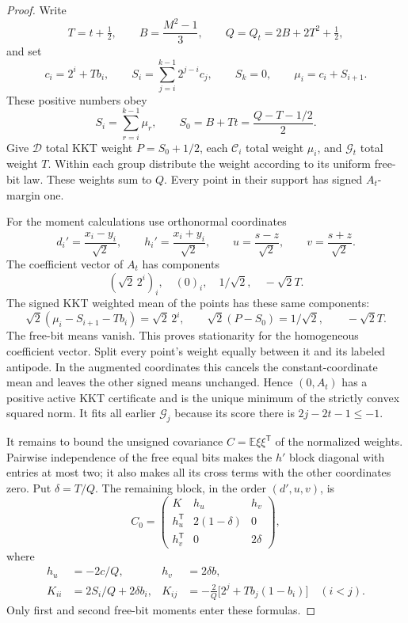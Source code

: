 \begin{proof}
Write
\[
 T=t+\tfrac12,\qquad B=\frac{M^2-1}{3},\qquad
 Q=Q_t=2B+2T^2+\tfrac12,
\]
and set
\[
 c_i=2^i+Tb_i,\qquad
 S_i=\sum_{j=i}^{k-1}2^{j-i}c_j,\qquad S_k=0,
 \qquad \mu_i=c_i+S_{i+1}.
\]
These positive numbers obey
\[
 S_i=\sum_{r=i}^{k-1}\mu_r,\qquad
 S_0=B+Tt=\frac{Q-T-1/2}{2}.
\]
Give $\mathcal D$ total KKT weight $P=S_0+1/2$, each $\mathcal C_i$
total weight $\mu_i$, and $\mathcal G_t$ total weight $T$. Within each
group distribute the weight according to its uniform free-bit law.
These weights sum to $Q$. Every point in their support has signed
$A_t$-margin one.

For the moment calculations use orthonormal coordinates
\[
 d_i'=\frac{x_i-y_i}{\sqrt2},\qquad
 h_i'=\frac{x_i+y_i}{\sqrt2},\qquad
 u=\frac{s-z}{\sqrt2},\qquad v=\frac{s+z}{\sqrt2}.
\]
The coefficient vector of $A_t$ has components
\[
 (\sqrt2\,2^i)_i,\quad (0)_i,\quad 1/\sqrt2,\quad-\sqrt2 T.
\]
The signed KKT weighted mean of the points has these same components:
\[
 \sqrt2(\mu_i-S_{i+1}-Tb_i)=\sqrt2\,2^i,\qquad
 \sqrt2(P-S_0)=1/\sqrt2,\qquad -\sqrt2 T.
\]
The free-bit means vanish. This proves stationarity for the homogeneous
coefficient vector. Split every point's weight equally between it and
its labeled antipode. In the augmented coordinates this cancels the
constant-coordinate mean and leaves the other signed means unchanged.
Hence $(0,A_t)$ has a positive active KKT certificate and is the unique
minimum of the strictly convex squared norm. It fits all earlier
$\mathcal G_j$ because its score there is $2j-2t-1\le-1$.

It remains to bound the unsigned covariance $C=\mathbb E\xi\xi^{\mathsf T}$
of the normalized weights. Pairwise independence of the free equal
bits makes the $h'$ block diagonal with entries at most two; it also
makes all its cross terms with the other coordinates zero. Put
$\delta=T/Q$. The remaining block, in the order $(d',u,v)$, is
\begin{equation}\label{eq:selector-cov-block}
 C_0=\begin{pmatrix}
       K & h_u & h_v\\
       h_u^{\mathsf T}&2(1-\delta)&0\\
       h_v^{\mathsf T}&0&2\delta
     \end{pmatrix},
\end{equation}
where
\begin{align*}
 h_u&=-2c/Q,&h_v&=2\delta b,\\
 K_{ii}&=2S_i/Q+2\delta b_i,&
 K_{ij}&=-\frac2Q\bigl[2^j+Tb_j(1-b_i)\bigr]\quad(i<j).
\end{align*}
Only first and second free-bit moments enter these formulas.


\end{proof}

